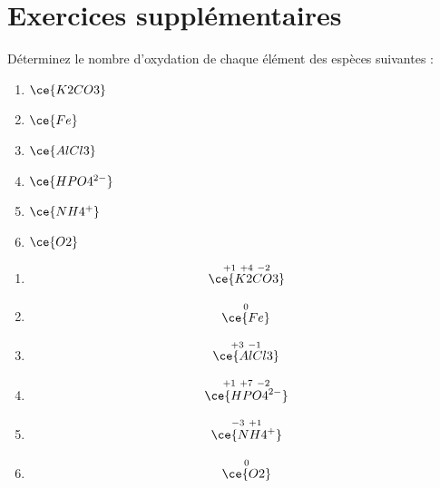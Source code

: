 \documentclass[
  11pt,
  a4paper,
  openany]{book}
\providecommand{\tightlist}{%
  \setlength{\itemsep}{0pt}\setlength{\parskip}{0pt}}
\begin{document}
\clearpage

\section{Exercices supplémentaires}\label{exercices-suppluxe9mentaires-13}

\begin{Exercise}

Déterminez le nombre d'oxydation de chaque élément des espèces suivantes :

\begin{enumerate}
\def\labelenumi{\alph{enumi}.}
\tightlist
\item
  \(\ce{K2CO3}\)
  \vspace{1em}
\item
  \(\ce{Fe}\)
  \vspace{1em}
\item
  \(\ce{AlCl3}\)
  \vspace{1em}
\item
  \(\ce{HPO4^{2-}}\)
  \vspace{1em}
\item
  \(\ce{NH4^+}\)
  \vspace{1em}
\item
  \(\ce{O2}\)
  \vspace{1em}
\end{enumerate}

\end{Exercise}

\begin{Answer}

\begin{enumerate}
\def\labelenumi{\alph{enumi}.}
\tightlist
\item
  \[
  \overset{+1\ +4\ -2}{\ce{K2CO3}}
  \]
\item
  \[
  \overset{0}{\ce{Fe}}
  \]
\item
  \[
  \overset{+3\ -1}{\ce{AlCl3}}
  \]
\item
  \[
  \overset{+1\ +7\ -2}{\ce{HPO4^{2-}}}
  \]
\item
  \[
  \overset{-3\ +1}{\ce{NH4^+}}
  \]
\item
  \[
  \overset{0}{\ce{O2}}
  \]
\end{enumerate}

\end{Answer}
\end{document}
